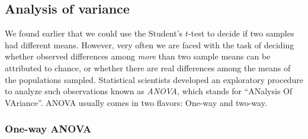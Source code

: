 \subsection{Analysis of variance}
	We found earlier that we could use the Student's $t$-test to decide if two 
samples had different means.  However, very often we are faced with the task of deciding 
whether observed differences among \emph{more} than two sample means can be attributed to chance, or 
whether there are real differences among the means of the populations sampled.
Statistical scientists developed an exploratory procedure to analyze such observations known as \emph{ANOVA},
which stands for ``ANalysis Of VAriance''.  ANOVA usually comes in two flavors: One-way and two-way.

\subsubsection{One-way ANOVA}


